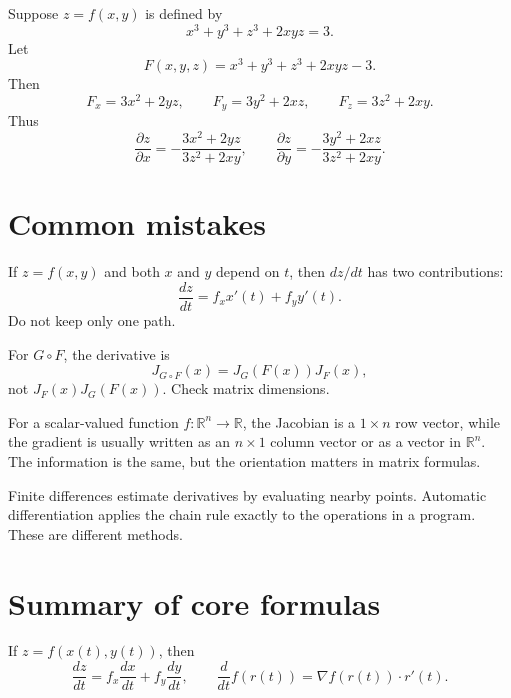 \documentclass[11pt]{article}
\newcommand{\R}{\mathbb R}
\newcommand{\grad}{\nabla}
\begin{document}
\begin{workedexample}
Suppose $z=f(x,y)$ is defined by
\[
x^3+y^3+z^3+2xyz=3.
\]
Let
\[
F(x,y,z)=x^3+y^3+z^3+2xyz-3.
\]
Then
\[
F_x=3x^2+2yz,
\qquad
F_y=3y^2+2xz,
\qquad
F_z=3z^2+2xy.
\]
Thus
\[
\frac{\partial z}{\partial x}=-\frac{3x^2+2yz}{3z^2+2xy},
\qquad
\frac{\partial z}{\partial y}=-\frac{3y^2+2xz}{3z^2+2xy}.
\]
\end{workedexample}

\section{Common mistakes}

\begin{warningbox}
If $z=f(x,y)$ and both $x$ and $y$ depend on $t$, then $dz/dt$ has two contributions:
\[
\frac{dz}{dt}=f_xx'(t)+f_yy'(t).
\]
Do not keep only one path.
\end{warningbox}

\begin{warningbox}
For $G\circ F$, the derivative is
\[
J_{G\circ F}(x)=J_G(F(x))J_F(x),
\]
not $J_F(x)J_G(F(x))$. Check matrix dimensions.
\end{warningbox}

\begin{warningbox}
For a scalar-valued function $f:\R^n\to\R$, the Jacobian is a $1\times n$ row vector, while the gradient is usually written as an $n\times 1$ column vector or as a vector in $\R^n$. The information is the same, but the orientation matters in matrix formulas.
\end{warningbox}

\begin{warningbox}
Finite differences estimate derivatives by evaluating nearby points. Automatic differentiation applies the chain rule exactly to the operations in a program. These are different methods.
\end{warningbox}

\section{Summary of core formulas}

\begin{formulabox}
If $z=f(x(t),y(t))$, then
\[
\frac{dz}{dt}=f_x\frac{dx}{dt}+f_y\frac{dy}{dt},
\qquad
\frac{d}{dt}f(r(t))=\grad f(r(t))\cdot r'(t).
\]
\end{formulabox}
\end{document}
